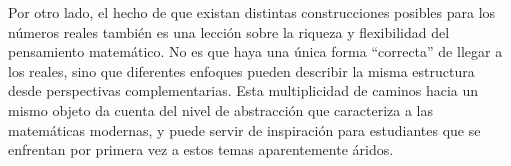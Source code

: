 \documentclass[a4paper,10pt]{article}
\begin{document}
Por otro lado, el hecho de que existan distintas construcciones posibles para los números reales también es una lección sobre la riqueza y flexibilidad del pensamiento matemático. No es que haya una única forma \enquote{correcta} de llegar a los reales, sino que diferentes enfoques pueden describir la misma estructura desde perspectivas complementarias. Esta multiplicidad de caminos hacia un mismo objeto da cuenta del nivel de abstracción que caracteriza a las matemáticas modernas, y puede servir de inspiración para estudiantes que se enfrentan por primera vez a estos temas aparentemente áridos.
\end{document}
